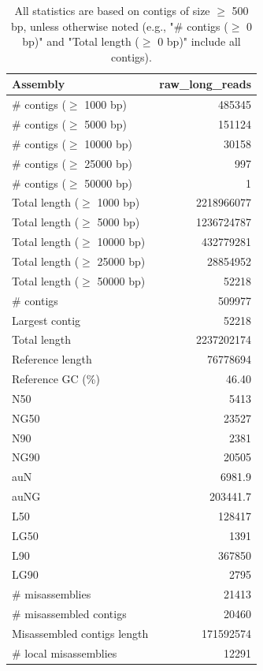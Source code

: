\documentclass[12pt,a4paper]{article}
\begin{document}
\begin{table}[ht]
\begin{center}
\caption{All statistics are based on contigs of size $\geq$ 500 bp, unless otherwise noted (e.g., "\# contigs ($\geq$ 0 bp)" and "Total length ($\geq$ 0 bp)" include all contigs).}
\begin{tabular}{|l*{1}{|r}|}
\hline
Assembly & raw\_long\_reads \\ \hline
\# contigs ($\geq$ 1000 bp) & 485345 \\ \hline
\# contigs ($\geq$ 5000 bp) & 151124 \\ \hline
\# contigs ($\geq$ 10000 bp) & 30158 \\ \hline
\# contigs ($\geq$ 25000 bp) & 997 \\ \hline
\# contigs ($\geq$ 50000 bp) & 1 \\ \hline
Total length ($\geq$ 1000 bp) & 2218966077 \\ \hline
Total length ($\geq$ 5000 bp) & 1236724787 \\ \hline
Total length ($\geq$ 10000 bp) & 432779281 \\ \hline
Total length ($\geq$ 25000 bp) & 28854952 \\ \hline
Total length ($\geq$ 50000 bp) & 52218 \\ \hline
\# contigs & 509977 \\ \hline
Largest contig & 52218 \\ \hline
Total length & 2237202174 \\ \hline
Reference length & 76778694 \\ \hline
Reference GC (\%) & 46.40 \\ \hline
N50 & 5413 \\ \hline
NG50 & 23527 \\ \hline
N90 & 2381 \\ \hline
NG90 & 20505 \\ \hline
auN & 6981.9 \\ \hline
auNG & 203441.7 \\ \hline
L50 & 128417 \\ \hline
LG50 & 1391 \\ \hline
L90 & 367850 \\ \hline
LG90 & 2795 \\ \hline
\# misassemblies & 21413 \\ \hline
\# misassembled contigs & 20460 \\ \hline
Misassembled contigs length & 171592574 \\ \hline
\# local misassemblies & 12291 \\ \hline

\end{tabular}
\end{center}
\end{table}
\end{document}
